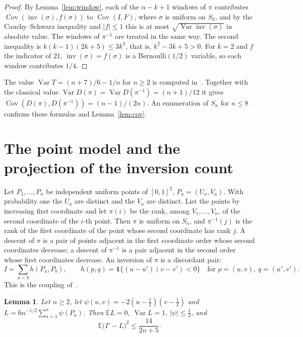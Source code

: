\documentclass[11pt]{amsart}
\newtheorem{lemma}[theorem]{Lemma}
\theoremstyle{remark}
\newcommand{\E}{\mathbb{E}}
\newcommand{\Var}{\operatorname{Var}}
\newcommand{\Cov}{\operatorname{Cov}}
\newcommand{\inv}{\operatorname{inv}}
\begin{document}
\begin{proof}
By Lemma~\ref{lem:window}, each of the $n-k+1$ windows of $\pi$ contributes
$\Cov(\inv(\sigma),f(\sigma))$ to $\Cov(I,F)$, where $\sigma$ is uniform on $S_k$, and by the Cauchy--Schwarz
inequality and $|f|\le1$ this is at most $\sqrt{\Var\inv(\sigma)}$ in absolute value. The windows of $\pi^{-1}$ are
treated in the same way. The second inequality is $k(k-1)(2k+5)\le3k^3$, that is, $k^2-3k+5>0$. For $k=2$ and $f$ the
indicator of $21$, $\inv(\sigma)=f(\sigma)$ is a Bernoulli$(1/2)$ variable, so each window contributes $1/4$.
\end{proof}

The value $\Var T=(n+7)/6-1/n$ for $n\ge2$ is computed in~\cite{CD}. Together with the classical value
$\Var D(\pi)=\Var D(\pi^{-1})=(n+1)/12$ it gives $\Cov(D(\pi),D(\pi^{-1}))=(n-1)/(2n)$. An enumeration of $S_n$ for $n\le8$ confirms these formulas and
Lemma~\ref{lem:cov}.

\section{The point model and the projection of the inversion count}\label{sec:proj}

Let $P_1,\dots,P_n$ be independent uniform points of $[0,1]^2$, $P_a=(U_a,V_a)$. With probability one the $U_a$ are
distinct and the $V_a$ are distinct. List the points by increasing first coordinate and let $\pi(i)$ be the rank, among
$V_1,\dots,V_n$, of the second coordinate of the $i$-th point. Then $\pi$ is uniform on $S_n$, and $\pi^{-1}(j)$ is
the rank of the first coordinate of the point whose second coordinate has rank $j$. A descent of $\pi$ is a pair of
points adjacent in the first coordinate order whose second coordinates decrease; a descent of $\pi^{-1}$ is a pair
adjacent in the second order whose first coordinates decrease. An inversion of $\pi$ is a discordant pair:
\[
I=\sum_{a<b}h(P_a,P_b),\qquad h(p,q)=\mathbf 1\{(u-u')(v-v')<0\}\quad\text{for }p=(u,v),\ q=(u',v').
\]
This is the coupling of~\cite[Section~5]{CD}.

\begin{lemma}\label{lem:hoeff}
Let $n\ge2$, let $\psi(u,v)=-2(u-\tfrac12)(v-\tfrac12)$ and $L=6n^{-1/2}\sum_{a=1}^n\psi(P_a)$. Then $\E L=0$, $\Var L=1$,
$|\psi|\le\tfrac12$, and
\[
\E\bigl(I'-L\bigr)^2\le\frac{14}{2n+5}.
\]
\end{lemma}
\end{document}
